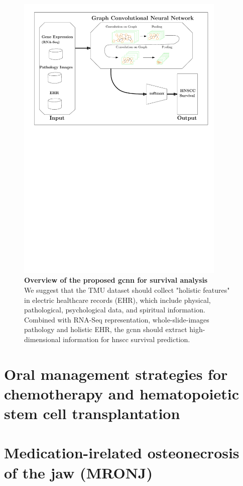 \documentclass[
paper=landscape,
paper=160mm:90mm, %
fontsize=11pt, %
pagesize, %
parskip=half-, %
]{scrartcl} %
\newcommand{\bcaption}[2]{\caption{\textbf{#1} #2}}
\newcommand{\bcaption}[2]{\caption{\textbf{#1} #2}}
\theoremstyle{mythmstyle} %
\begin{document}
{%
\begin{figure}[hp]
\centering
\includegraphics[width=10cm]{GCNN_survival.pdf}
\bcaption{Overview of the proposed \acrshort{gcnn} for survival analysis}
{\\We suggest that the TMU dataset should collect "holistic features" in electric healthcare records (EHR), which include physical, pathological, psychological data, and spiritual information. Combined with RNA-Seq representation, whole-slide-images pathology and holistic EHR, the \acrfull{gcnn} should extract high-dimensional information for \acrshort{hnscc} survival prediction.}
\label{fig:GCNN}
\end{figure}

} %


\clearpage
\section{Oral management strategies for chemotherapy and hematopoietic stem cell transplantation}
\autocite{Harris2022, Kawashita2020, Migliorati2022}
\section{Medication-irelated osteonecrosis of the jaw (MRONJ)}
\thispagestyle{headings}
\autocite{Harris2022, Kawashita2020, Migliorati2022}
\end{document}

